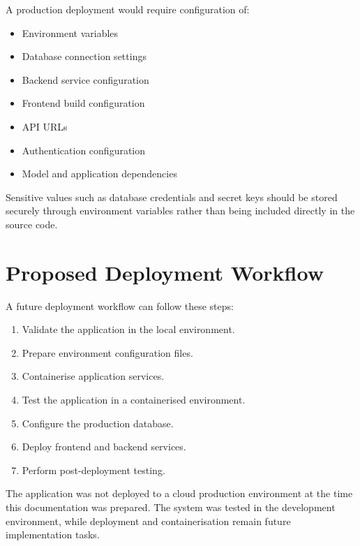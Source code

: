 \documentclass[12pt,a4paper]{report}
\begin{document}
A production deployment would require configuration of:

\begin{itemize}
    \item Environment variables
    \item Database connection settings
    \item Backend service configuration
    \item Frontend build configuration
    \item API URLs
    \item Authentication configuration
    \item Model and application dependencies
\end{itemize}

Sensitive values such as database credentials and secret keys should be
stored securely through environment variables rather than being included
directly in the source code.



\section{Proposed Deployment Workflow}

A future deployment workflow can follow these steps:

\begin{enumerate}
    \item Validate the application in the local environment.
    \item Prepare environment configuration files.
    \item Containerise application services.
    \item Test the application in a containerised environment.
    \item Configure the production database.
    \item Deploy frontend and backend services.
    \item Perform post-deployment testing.
\end{enumerate}

\begin{tcolorbox}[
    colback=lightblue,
    colframe=primaryblue,
    title=\textbf{Current Deployment Status},
    arc=3mm
]

The application was not deployed to a cloud production environment at
the time this documentation was prepared. The system was tested in the
development environment, while deployment and containerisation remain
future implementation tasks.

\end{tcolorbox}
\end{document}
